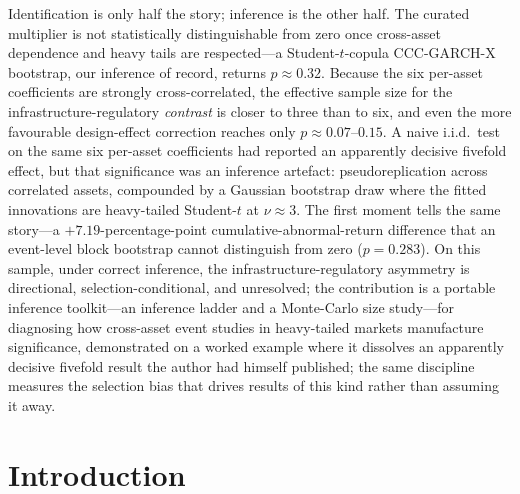 \documentclass[pdflatex,sn-mathphys-num]{sn-jnl}
\theoremstyle{thmstyleone}
\theoremstyle{thmstyletwo}
\theoremstyle{thmstylethree}
\begin{document}
{Identification is only half the story; inference is the other half. The curated multiplier is not statistically distinguishable from zero once cross-asset dependence and heavy tails are respected---a Student-$t$-copula CCC-GARCH-X bootstrap, our inference of record, returns $p\approx 0.32$. Because the six per-asset coefficients are strongly cross-correlated, the effective sample size for the infrastructure-regulatory \emph{contrast} is closer to three than to six, and even the more favourable design-effect correction reaches only $p\approx 0.07$--$0.15$. A naive i.i.d.\ test on the same six per-asset coefficients had reported an apparently decisive fivefold effect, but that significance was an inference artefact: pseudoreplication across correlated assets, compounded by a Gaussian bootstrap draw where the fitted innovations are heavy-tailed Student-$t$ at $\nu\approx 3$. The first moment tells the same story---a $+7.19$-percentage-point cumulative-abnormal-return difference that an event-level block bootstrap cannot distinguish from zero ($p=0.283$). On this sample, under correct inference, the infrastructure-regulatory asymmetry is directional, selection-conditional, and unresolved; the contribution is a portable inference toolkit---an inference ladder and a Monte-Carlo size study---for diagnosing how cross-asset event studies in heavy-tailed markets manufacture significance, demonstrated on a worked example where it dissolves an apparently decisive fivefold result the author had himself published; the same discipline measures the selection bias that drives results of this kind rather than assuming it away.
}


\maketitle


\section{Introduction}\label{sec:intro}
\end{document}
